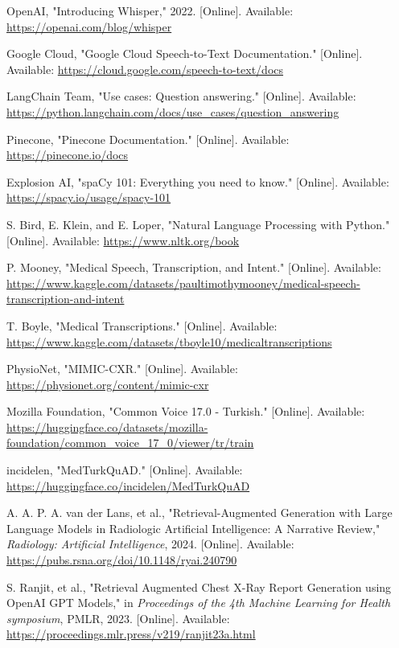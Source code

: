 \begin{thebibliography}{99}
OpenAI, "Introducing Whisper," 2022. [Online]. Available: \url{https://openai.com/blog/whisper}

Google Cloud, "Google Cloud Speech-to-Text Documentation." [Online]. Available: \url{https://cloud.google.com/speech-to-text/docs}

LangChain Team, "Use cases: Question answering." [Online]. Available: \url{https://python.langchain.com/docs/use_cases/question_answering}

Pinecone, "Pinecone Documentation." [Online]. Available: \url{https://pinecone.io/docs}

Explosion AI, "spaCy 101: Everything you need to know." [Online]. Available: \url{https://spacy.io/usage/spacy-101}

S. Bird, E. Klein, and E. Loper, "Natural Language Processing with Python." [Online]. Available: \url{https://www.nltk.org/book}

P. Mooney, "Medical Speech, Transcription, and Intent." [Online]. Available: \url{https://www.kaggle.com/datasets/paultimothymooney/medical-speech-transcription-and-intent}

T. Boyle, "Medical Transcriptions." [Online]. Available: \url{https://www.kaggle.com/datasets/tboyle10/medicaltranscriptions}

PhysioNet, "MIMIC-CXR." [Online]. Available: \url{https://physionet.org/content/mimic-cxr}

Mozilla Foundation, "Common Voice 17.0 - Turkish." [Online]. Available: \url{https://huggingface.co/datasets/mozilla-foundation/common_voice_17_0/viewer/tr/train}

incidelen, "MedTurkQuAD." [Online]. Available: \url{https://huggingface.co/incidelen/MedTurkQuAD}

A. A. P. A. van der Lans, et al., "Retrieval-Augmented Generation with Large Language Models in Radiologic Artificial Intelligence: A Narrative Review," \textit{Radiology: Artificial Intelligence}, 2024. [Online]. Available: \url{https://pubs.rsna.org/doi/10.1148/ryai.240790}

S. Ranjit, et al., "Retrieval Augmented Chest X-Ray Report Generation using OpenAI GPT Models," in \textit{Proceedings of the 4th Machine Learning for Health symposium}, PMLR, 2023. [Online]. Available: \url{https://proceedings.mlr.press/v219/ranjit23a.html}


\end{thebibliography}
